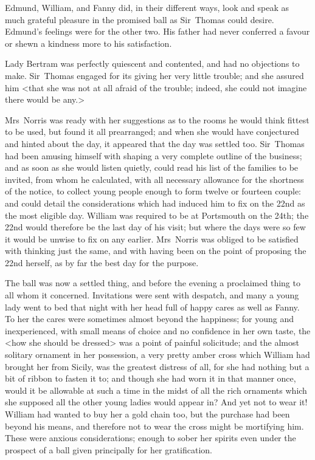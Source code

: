 Edmund, William, and Fanny did, in their different ways, look and speak as much grateful pleasure in the promised ball as Sir~Thomas could desire. Edmund's feelings were for the other two. His father had never conferred a favour or shewn a kindness more to his satisfaction.

Lady Bertram was perfectly quiescent and contented, and had no objections to make. Sir~Thomas engaged for its giving her very little trouble; and she assured him <that she was not at all afraid of the trouble; indeed, she could not imagine there would be any.>

Mrs~Norris was ready with her suggestions as to the rooms he would think fittest to be used, but found it all prearranged; and when she would have conjectured and hinted about the day, it appeared that the day was settled too. Sir~Thomas had been amusing himself with shaping a very complete outline of the business; and as soon as she would listen quietly, could read his list of the families to be invited, from whom he calculated, with all necessary allowance for the shortness of the notice, to collect young people enough to form twelve or fourteen couple: and could detail the considerations which had induced him to fix on the 22nd as the most eligible day. William was required to be at Portsmouth on the 24th; the 22nd would therefore be the last day of his visit; but where the days were so few it would be unwise to fix on any earlier. Mrs~Norris was obliged to be satisfied with thinking just the same, and with having been on the point of proposing the 22nd herself, as by far the best day for the purpose.

The ball was now a settled thing, and before the evening a proclaimed thing to all whom it concerned. Invitations were sent with despatch, and many a young lady went to bed that night with her head full of happy cares as well as Fanny. To her the cares were sometimes almost beyond the happiness; for young and inexperienced, with small means of choice and no confidence in her own taste, the <how she should be dressed> was a point of painful solicitude; and the almost solitary ornament in her possession, a very pretty amber cross which William had brought her from Sicily, was the greatest distress of all, for she had nothing but a bit of ribbon to fasten it to; and though she had worn it in that manner once, would it be allowable at such a time in the midst of all the rich ornaments which she supposed all the other young ladies would appear in? And yet not to wear it! William had wanted to buy her a gold chain too, but the purchase had been beyond his means, and therefore not to wear the cross might be mortifying him. These were anxious considerations; enough to sober her spirits even under the prospect of a ball given principally for her gratification.

